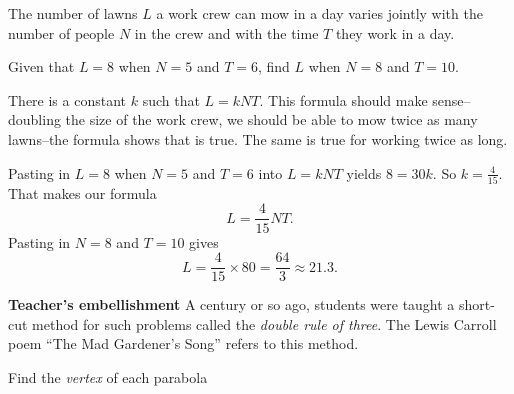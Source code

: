 \documentclass[12pt,fleqn,answers]{exam}
\begin{document}
\begin{questions}
    \question [5] The number of lawns $L$ a work crew can mow in a day 
varies jointly with the number of people $N$ in the crew and with
the time $T$  they work in a day.

Given that $L = 8$ when $N = 5$ and $T = 6$, find $L$ when
$N = 8$ and $T = 10$.
\begin{solution}[3.5in]
There is a constant $k$ such that $L =k N T$. This formula should make sense--doubling the size of the work crew, we
should be able to mow twice as many lawns--the formula shows that is true. The same is true for working twice as long.

Pasting in $L = 8$ when $N = 5$ and $T = 6$ into $L =k N T$ yields $8 = 30 k$.  So $k = \frac{4}{15}$.  That makes
our formula
\begin{equation*}
L = \frac{4}{15} N T.
\end{equation*}
Pasting in $N = 8$ and $T = 10$ gives
\begin{equation*}
L = \frac{4}{15} \times 80 = \frac{64}{3} \approx 21.3.
\end{equation*}


\textbf{Teacher's embellishment} A century or so ago, students were taught 
a short-cut method for such problems called the \emph{double rule of three}.
The Lewis Carroll poem ``The Mad Gardener's Song'' refers to this method.


\end{solution}

\question Find the \emph{vertex} of each parabola

\end{questions}
\end{document}

